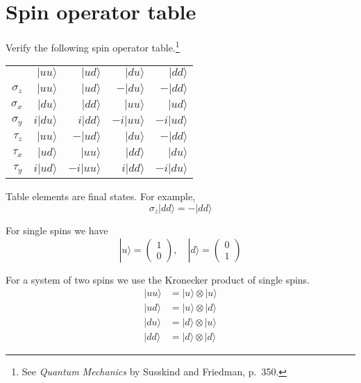 

\section*{Spin operator table}

Verify the following spin operator table.\footnote
{See {\it Quantum Mechanics} by Susskind and Friedman, p.~350.}

\begin{center}
\begin{tabular}{rrrrr}
& $|uu\rangle$ & $|ud\rangle$ & $|du\rangle$ & $|dd\rangle$
\\[1ex]
$\sigma_z$ & $|uu\rangle$ & $|ud\rangle$ & $-|du\rangle$ & $-|dd\rangle$
\\
$\sigma_x$ & $|du\rangle$ & $|dd\rangle$ & $|uu\rangle$ & $|ud\rangle$
\\
$\sigma_y$ & $i|du\rangle$ & $i|dd\rangle$ & $-i|uu\rangle$ & $-i|ud\rangle$
\\
$\tau_z$ & $|uu\rangle$ & $-|ud\rangle$ & $|du\rangle$ & $-|dd\rangle$
\\
$\tau_x$ & $|ud\rangle$ & $|uu\rangle$ & $|dd\rangle$ & $|du\rangle$
\\
$\tau_y$ & $i|ud\rangle$ & $-i|uu\rangle$ & $i|dd\rangle$ & $-i|du\rangle$
\end{tabular}
\end{center}

Table elements are final states.
For example,
\begin{equation*}
\sigma_z|dd\rangle=-|dd\rangle
\end{equation*}

For single spins we have
\begin{equation*}
|u\rangle=\begin{pmatrix}1\\0\end{pmatrix},
\quad
|d\rangle=\begin{pmatrix}0\\1\end{pmatrix}
\end{equation*}

For a system of two spins we use the Kronecker product of single spins.
\begin{align*}
|uu\rangle&=|u\rangle\otimes|u\rangle
\\
|ud\rangle&=|u\rangle\otimes|d\rangle
\\
|du\rangle&=|d\rangle\otimes|u\rangle
\\
|dd\rangle&=|d\rangle\otimes|d\rangle
\end{align*}

